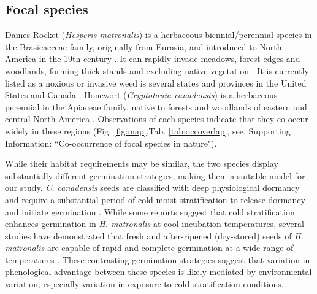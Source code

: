 \documentclass{article}[11pt]
\begin{document}

\subsection*{Focal species}
Dames Rocket (\textit{Hesperis matronalis}) is a herbaceous biennial/perennial species in the Brasicaeceae family, originally from Eurasia, and introduced to North America in the 19th century \citep{Francis:2009wz}. It  can rapidly invade  meadows, forest edges and woodlands, forming thick stands and excluding native vegetation \citep{Francis:2009wz}. It is currently listed as a noxious or invasive weed is several states and provinces in the United States and Canada \citep{Susko:2008ut}. Honewort (\textit{Cryptotania canadensis}) is a herbaceous perennial in the Apiaceae family, native to forests and woodlands of eastern and central North America \citep{Hawkins:2007vb}. Observations of each species indicate that they co-occur widely in these regions (Fig. \ref{fig:map},Tab. \ref{tab:occoverlap}, see, Supporting Information: ``Co-occurrence of focal species in nature").  


While their habitat requirements may be similar, the two species display substantially different germination strategies, making them a suitable model for our study. \textit{C. canadensis} seeds are classified with deep physiological dormancy and require a substantial period of cold moist stratification to release dormancy and initiate germination \citep{Baskin:1988um}. While some reports suggest that cold stratification enhances germination in \textit{H. matronalis} at cool incubation temperatures, several studies have demonstrated that fresh and after-ripened (dry-stored) seeds of \textit{H. matronalis} are capable of rapid and complete germination at a wide range of temperatures \citep{Susko:2008ut}. These contrasting germination strategies suggest that variation in phenological advantage between these species is likely mediated by environmental variation; especially variation in exposure to cold stratification conditions.
\end{document}
